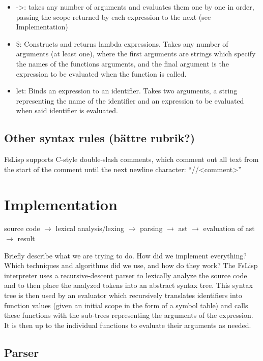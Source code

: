 \documentclass[11pt]{article}
\begin{document}
\begin{itemize}
            \item -\textgreater: takes any number of arguments and evaluates them one by one in order, passing the scope returned by each expression to the next (see Implementation)
            \item \$: Constructs and returns lambda expressions. Takes any number of arguments (at least one), where the first arguments are strings which specify the names of the functions arguments, and the final argument is the expression to be evaluated when the function is called.
            \item let: Binds an expression to an identifier. Takes two arguments, a string representing the name of the identifier and an expression to be evaluated when said identifier is evaluated.
        \end{itemize}

    \subsection{Other syntax rules (bättre rubrik?)}
        FsLisp supports C-style double-slash comments, which comment out all text from the start of the comment until the next newline character: “//\textless comment\textgreater”


\section{Implementation}
	source code $\rightarrow$ lexical analysis/lexing $\rightarrow$ parsing $\rightarrow$ ast $\rightarrow$ evaluation of ast $\rightarrow$ result

Briefly describe what we are trying to do. How did we implement everything? Which techniques and algorithms did we use, and how do they work?
\newline
\newline
The FsLisp interpreter uses a recursive-descent parser to lexically analyze the source code and to then place the analyzed tokens into an abstract syntax tree. This syntax tree is then used by an evaluator which recursively translates identifiers into function values (given an initial scope in the form of a symbol table) and calls these functions with the sub-trees representing the arguments of the expression. It is then up to the individual functions to evaluate their arguments as needed.

\subsection{Parser}
\end{document}
